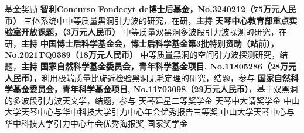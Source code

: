 \begin{rubric}{基金奖励}
    \entry*[2024 -- 2027] \textbf{智利Concurso Fondecyt de博士后基金，No.3240212（75万元人民币）}
    三体系统中中等质量黑洞引力波的研究，在研，\textbf{主持}
    \entry*[2024 -- 2026] \textbf{天琴中心教育部重点实验室开放课题，（3万元人民币）}
    中等质量双黑洞多波段引力波探测的研究，在研，\textbf{主持}
    \entry*[2021 -- 2023] \textbf{中国博士后科学基金会，博士后科学基金第3批特别资助（站前），No.2021TQ0389（18万元人民币）}
    中等质量黑洞的空间引力波探测研究，结题，\textbf{主持}
    \entry*[2019 -- 2021] \textbf{国家自然科学基金委员会，青年科学基金项目,
    No.11805286（28万元人民币）}，利用极端质量比旋近检验黑洞无毛定理的研究，结题，参与 
    \entry*[2018 -- 2020] \textbf{国家自然科学基金委员会，青年科学基金项目,
    No.11703098（29万元人民币）}，基于双黑洞的多波段引力波天文学，结题，参与 
%
    \entry*[2020] 天琴建星二等奖学金
    \entry*[2019] 天琴中大请奖学金
    \entry*[2019] 中山大学天琴中心与华中科技大学引力中心年会优秀报告三等奖 
    \entry*[2018] 中山大学天琴中心与华中科技大学引力中心年会优秀海报奖
    \entry*[2015] 国家奖学金
\end{rubric}
